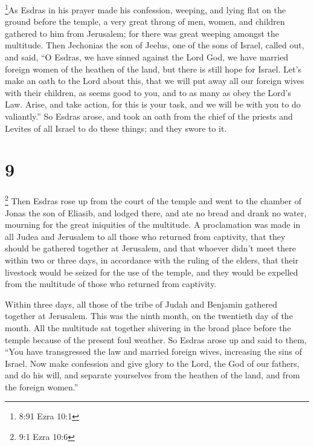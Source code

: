  \footnote{8:91 Ezra 10:1}As Esdras in his prayer made his
confession, weeping, and lying flat on the ground before the temple, a
very great throng of men, women, and children gathered to him from
Jerusalem; for there was great weeping amongst the multitude.
 Then Jechonias the son of Jeelus, one of the sons of
Israel, called out, and said, ``O Esdras, we have sinned against the
Lord God, we have married foreign women of the heathen of the land, but
there is still hope for Israel.  Let's make an oath to the
Lord about this, that we will put away all our foreign wives with their
children,  as seems good to you, and to as many as obey the
Lord's Law.  Arise, and take action, for this is your task,
and we will be with you to do valiantly.''  So Esdras
arose, and took an oath from the chief of the priests and Levites of all
Israel to do these things; and they swore to it.

\hypertarget{section-8}{%
\section{9}\label{section-8}}

 \footnote{9:1 Ezra 10:6} Then Esdras rose up from the court
of the temple and went to the chamber of Jonas the son of Eliasib,
 and lodged there, and ate no bread and drank no water,
mourning for the great iniquities of the multitude.  A
proclamation was made in all Judea and Jerusalem to all those who
returned from captivity, that they should be gathered together at
Jerusalem,  and that whoever didn't meet there within two or
three days, in accordance with the ruling of the elders, that their
livestock would be seized for the use of the temple, and they would be
expelled from the multitude of those who returned from captivity.

 Within three days, all those of the tribe of Judah and
Benjamin gathered together at Jerusalem. This was the ninth month, on
the twentieth day of the month.  All the multitude sat
together shivering in the broad place before the temple because of the
present foul weather.  So Esdras arose up and said to them,
``You have transgressed the law and married foreign wives, increasing
the sins of Israel.  Now make confession and give glory to
the Lord, the God of our fathers,  and do his will, and
separate yourselves from the heathen of the land, and from the foreign
women.''

